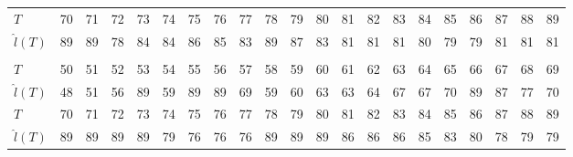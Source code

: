 \documentclass[12pt,a4paper]{article}
\begin{document}
\begin{table}
\begin{tabular*}{\textheight}{@{\extracolsep{\fill}}lrrrrrrrrrrrrrrrrrrrr}
		$T$ & 70 & 71 & 72 & 73 & 74 & 75 & 76 & 77 & 78 & 79 & 80 & 81 & 82 & 83 & 84 & 85 & 86 & 87 & 88 & 89 \\
		$\hat{l}(T)$ & 89 & 89 & 78 & 84 & 84 & 86 & 85 & 83 & 89 & 87 & 83 & 81 & 81 & 81 & 80 & 79 & 79 & 81 & 81 & 81 \\
		\midrule\addlinespace[2.5pt]
		\multicolumn{21}{c}{\textbf{$\tau=0.95,\ T_{\mathrm{entry}}(5)=85$}} \\
		\addlinespace[2.5pt]
		\midrule
		$T$ & 50 & 51 & 52 & 53 & 54 & 55 & 56 & 57 & 58 & 59 & 60 & 61 & 62 & 63 & 64 & 65 & 66 & 67 & 68 & 69 \\
		$\hat{l}(T)$ & 48 & 51 & 56 & 89 & 59 & 89 & 89 & 69 & 59 & 60 & 63 & 63 & 64 & 67 & 67 & 70 & 89 & 87 & 77 & 70 \\
		$T$ & 70 & 71 & 72 & 73 & 74 & 75 & 76 & 77 & 78 & 79 & 80 & 81 & 82 & 83 & 84 & 85 & 86 & 87 & 88 & 89 \\
		$\hat{l}(T)$ & 89 & 89 & 89 & 89 & 79 & 76 & 76 & 76 & 89 & 89 & 89 & 86 & 86 & 86 & 85 & 83 & 80 & 78 & 79 & 79 \\
		\bottomrule
	\end{tabular*}
\end{table}
\end{document}
